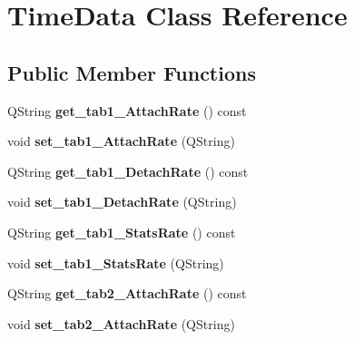 \hypertarget{class_time_data}{}\section{Time\+Data Class Reference}
\label{class_time_data}
\subsection*{Public Member Functions}
\begin{DoxyCompactItemize}
\item 
Q\+String {\bfseries get\+\_\+tab1\+\_\+\+Attach\+Rate} () const \hypertarget{class_time_data_aec75341b27e5e4715a317aa01b6af676}{}\label{class_time_data_aec75341b27e5e4715a317aa01b6af676}

\item 
void {\bfseries set\+\_\+tab1\+\_\+\+Attach\+Rate} (Q\+String)\hypertarget{class_time_data_aa670a5a97e01041f98be3f8c808b526f}{}\label{class_time_data_aa670a5a97e01041f98be3f8c808b526f}

\item 
Q\+String {\bfseries get\+\_\+tab1\+\_\+\+Detach\+Rate} () const \hypertarget{class_time_data_ae5707c52098e75fcbe638d53db16aaa0}{}\label{class_time_data_ae5707c52098e75fcbe638d53db16aaa0}

\item 
void {\bfseries set\+\_\+tab1\+\_\+\+Detach\+Rate} (Q\+String)\hypertarget{class_time_data_a2197b57d22077b7d652a6de2593ee574}{}\label{class_time_data_a2197b57d22077b7d652a6de2593ee574}

\item 
Q\+String {\bfseries get\+\_\+tab1\+\_\+\+Stats\+Rate} () const \hypertarget{class_time_data_ac615a068cab4073912f5d757a2ebf126}{}\label{class_time_data_ac615a068cab4073912f5d757a2ebf126}

\item 
void {\bfseries set\+\_\+tab1\+\_\+\+Stats\+Rate} (Q\+String)\hypertarget{class_time_data_a601f066eab05a5455c7ba7c7fdab6e98}{}\label{class_time_data_a601f066eab05a5455c7ba7c7fdab6e98}

\item 
Q\+String {\bfseries get\+\_\+tab2\+\_\+\+Attach\+Rate} () const \hypertarget{class_time_data_a5061e854458249dbb7cd92c7b0d85313}{}\label{class_time_data_a5061e854458249dbb7cd92c7b0d85313}

\item 
void {\bfseries set\+\_\+tab2\+\_\+\+Attach\+Rate} (Q\+String)\hypertarget{class_time_data_a91dccc87fdc25bfc3143dbc0d0d26d64}{}\label{class_time_data_a91dccc87fdc25bfc3143dbc0d0d26d64}


\end{DoxyCompactItemize}
